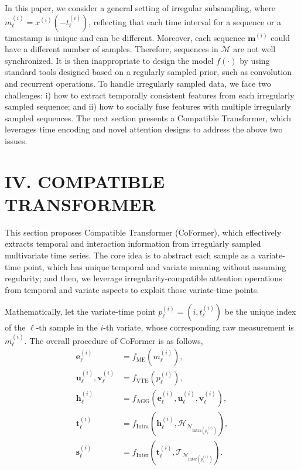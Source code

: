\documentclass[twocolumn]{article}
\begin{document}
In this paper, we consider a general setting of irregular subsampling, where $m_\ell^{(i)} = x^{(i)}(-t_\ell^{(i)})$, reflecting that each time interval for a sequence or a timestamp is unique and can be different. Moreover, each sequence $\mathbf{m}^{(i)}$ could have a different number of samples. Therefore, sequences in $\mathcal{M}$ are not well synchronized. It is then inappropriate to design the model $f(\cdot)$ by using standard tools designed based on a regularly sampled prior, such as convolution and recurrent operations. To handle irregularly sampled data, we face two challenges: i) how to extract temporally consistent features from each irregularly sampled sequence; and ii) how to socially fuse features with multiple irregularly sampled sequences. The next section presents a Compatible Transformer, which leverages time encoding and novel attention designs to address the above two issues.

\section*{IV. COMPATIBLE TRANSFORMER}

This section proposes Compatible Transformer (CoFormer), which effectively extracts temporal and interaction information from irregularly sampled multivariate time series. The core idea is to abstract each sample as a variate-time point, which has unique temporal and variate meaning without assuming regularity; and then, we leverage irregularity-compatible attention operations from temporal and variate aspects to exploit those variate-time points.

Mathematically, let the variate-time point $p_\ell^{(i)} = (i, t_\ell^{(i)})$ be the unique index of the $\ell$-th sample in the $i$-th variate, whose corresponding raw measurement is $m_\ell^{(i)}$. The overall procedure of CoFormer is as follows,
\begin{align}
    \mathbf{e}_\ell^{(i)} &= f_{\text{ME}}(m_\ell^{(i)}), \label{eq:1a} \\
    \mathbf{u}_\ell^{(i)}, \mathbf{v}_\ell^{(i)} &= f_{\text{VTE}}(p_\ell^{(i)}), \label{eq:1b} \\
    \mathbf{h}_\ell^{(i)} &= f_{\text{AGG}}(\mathbf{e}_\ell^{(i)}, \mathbf{u}_\ell^{(i)}, \mathbf{v}_\ell^{(i)}), \label{eq:1c} \\
    \mathbf{t}_\ell^{(i)} &= f_{\text{Intra}}(\mathbf{h}_\ell^{(i)}, \mathcal{H}_{\mathcal{N}_{\text{Intra}(p_\ell^{(i)})}}), \label{eq:1d} \\
    \mathbf{s}_\ell^{(i)} &= f_{\text{Inter}}(\mathbf{t}_\ell^{(i)}, \mathcal{T}_{\mathcal{N}_{\text{Inter}(p_\ell^{(i)})}}). \label{eq:1e}
\end{align}
\end{document}
